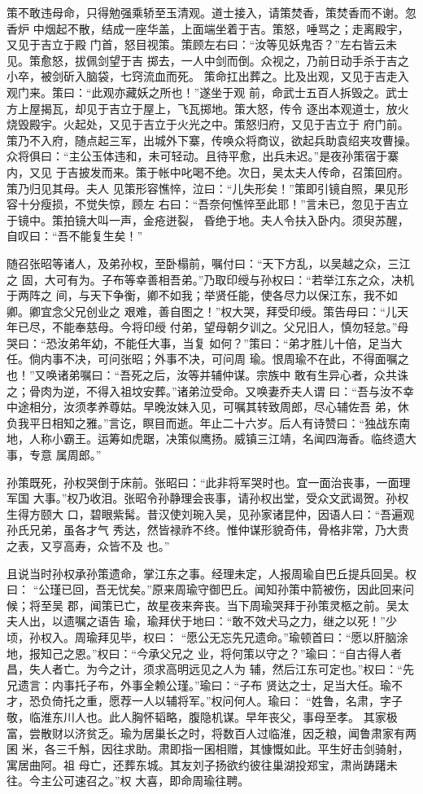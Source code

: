 策不敢违母命，只得勉强乘轿至玉清观。道士接入，请策焚香，策焚香而不谢。忽香炉
中烟起不散，结成一座华盖，上面端坐着于吉。策怒，唾骂之；走离殿宇，又见于吉立于殿
门首，怒目视策。策顾左右曰：“汝等见妖鬼否？”左右皆云未见。策愈怒，拔佩剑望于吉
掷去，一人中剑而倒。众视之，乃前日动手杀于吉之小卒，被剑斫入脑袋，七窍流血而死。
策命扛出葬之。比及出观，又见于吉走入观门来。策曰：“此观亦藏妖之所也！”遂坐于观
前，命武士五百人拆毁之。武士方上屋揭瓦，却见于吉立于屋上，飞瓦掷地。策大怒，传令
逐出本观道士，放火烧毁殿宇。火起处，又见于吉立于火光之中。策怒归府，又见于吉立于
府门前。策乃不入府，随点起三军，出城外下寨，传唤众将商议，欲起兵助袁绍夹攻曹操。
众将俱曰：“主公玉体违和，未可轻动。且待平愈，出兵未迟。”是夜孙策宿于寨内，又见
于吉披发而来。策于帐中叱喝不绝。次日，吴太夫人传命，召策回府。策乃归见其母。夫人
见策形容憔悴，泣曰：“儿失形矣！”策即引镜自照，果见形容十分瘦损，不觉失惊，顾左
右曰：“吾奈何憔悴至此耶！”言未已，忽见于吉立于镜中。策拍镜大叫一声，金疮迸裂，
昏绝于地。夫人令扶入卧内。须臾苏醒，自叹曰：“吾不能复生矣！”

随召张昭等诸人，及弟孙权，至卧榻前，嘱付曰：“天下方乱，以吴越之众，三江之
固，大可有为。子布等幸善相吾弟。”乃取印绶与孙权曰：“若举江东之众，决机于两阵之
间，与天下争衡，卿不如我；举贤任能，使各尽力以保江东，我不如卿。卿宜念父兄创业之
艰难，善自图之！”权大哭，拜受印绶。策告母曰：“儿天年已尽，不能奉慈母。今将印绶
付弟，望母朝夕训之。父兄旧人，慎勿轻怠。”母哭曰：“恐汝弟年幼，不能任大事，当复
如何？”策曰：“弟才胜儿十倍，足当大任。倘内事不决，可问张昭；外事不决，可问周
瑜。恨周瑜不在此，不得面嘱之也！”又唤诸弟嘱曰：“吾死之后，汝等并辅仲谋。宗族中
敢有生异心者，众共诛之；骨肉为逆，不得入祖坟安葬。”诸弟泣受命。又唤妻乔夫人谓
曰：“吾与汝不幸中途相分，汝须孝养尊姑。早晚汝妹入见，可嘱其转致周郎，尽心辅佐吾
弟，休负我平日相知之雅。”言讫，瞑目而逝。年止二十六岁。后人有诗赞曰：“独战东南
地，人称小霸王。运筹如虎踞，决策似鹰扬。威镇三江靖，名闻四海香。临终遗大事，专意
属周郎。”

孙策既死，孙权哭倒于床前。张昭曰：“此非将军哭时也。宜一面治丧事，一面理军国
大事。”权乃收泪。张昭令孙静理会丧事，请孙权出堂，受众文武谒贺。孙权生得方颐大
口，碧眼紫髯。昔汉使刘琬入吴，见孙家诸昆仲，因语人曰：“吾遍观孙氏兄弟，虽各才气
秀达，然皆禄祚不终。惟仲谋形貌奇伟，骨格非常，乃大贵之表，又亨高寿，众皆不及
也。”

且说当时孙权承孙策遗命，掌江东之事。经理未定，人报周瑜自巴丘提兵回吴。权曰：
“公瑾已回，吾无忧矣。”原来周瑜守御巴丘。闻知孙策中箭被伤，因此回来问候；将至吴
郡，闻策已亡，故星夜来奔丧。当下周瑜哭拜于孙策灵柩之前。吴太夫人出，以遗嘱之语告
瑜，瑜拜伏于地曰：“敢不效犬马之力，继之以死！”少顷，孙权入。周瑜拜见毕，权曰：
“愿公无忘先兄遗命。”瑜顿首曰：“愿以肝脑涂地，报知己之恩。”权曰：“今承父兄之
业，将何策以守之？”瑜曰：“自古得人者昌，失人者亡。为今之计，须求高明远见之人为
辅，然后江东可定也。”权曰：“先兄遗言：内事托子布，外事全赖公瑾。”瑜曰：“子布
贤达之士，足当大任。瑜不才，恐负倚托之重，愿荐一人以辅将军。”权问何人。瑜曰：
“姓鲁，名肃，字子敬，临淮东川人也。此人胸怀韬略，腹隐机谋。早年丧父，事母至孝。
其家极富，尝散财以济贫乏。瑜为居巢长之时，将数百人过临淮，因乏粮，闻鲁肃家有两囷
米，各三千斛，因往求助。肃即指一囷相赠，其慷慨如此。平生好击剑骑射，寓居曲阿。祖
母亡，还葬东城。其友刘子扬欲约彼往巢湖投郑宝，肃尚踌躇未往。今主公可速召之。”权
大喜，即命周瑜往聘。

